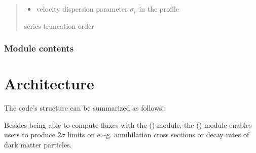 \documentclass[letterpaper,10pt,english]{sphinxmanual}
\let\sphinxpxdimen\pdfpxdimen\else\newdimen\sphinxpxdimen
\begin{document}
\begin{fulllineitems}
\begin{quote}
\begin{description}
\begin{itemize}
\item {} 
\sphinxAtStartPar
{} \textendash{} velocity dispersion parameter \(\sigma_v\) in the {\hyperref[\detokenize{diffsph.profiles:diffsph.profiles.templates.sis}]{}} profile

\end{itemize}

\sphinxAtStartPar
series truncation order 

\end{description}\end{quote}

\end{fulllineitems}



\subsection{Module contents}
\label{\detokenize{diffsph:module-diffsph}}\label{\detokenize{diffsph:module-contents}}
\begin{DUlineblock}{0em}
\item[] 
\end{DUlineblock}


\chapter{Architecture}
\label{\detokenize{index:architecture}}
\sphinxAtStartPar
The code’s structure can be summarized as follows:

\noindent\sphinxincludegraphics[width=1000\sphinxpxdimen]{{flowchart}.png}

\sphinxAtStartPar
Besides being able to compute fluxes with the  ({\hyperref[\detokenize{diffsph:module-diffsph.pyflux}]{}}) module, the  ({\hyperref[\detokenize{diffsph:module-diffsph.limits}]{}}) module enables users to produce 2\(\sigma\) limits on e.\textasciitilde{}g. annihilation cross sections or decay rates of dark matter particles.

\begin{DUlineblock}{0em}
\item[] 
\end{DUlineblock}
\end{document}
